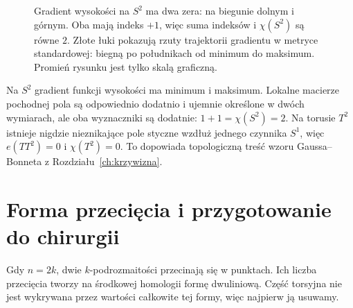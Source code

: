 \begin{figure}[htbp]
\centering
{}
\caption{Gradient wysokości na $S^2$
ma dwa zera: na biegunie dolnym
i górnym. Oba mają indeks $+1$,
więc suma indeksów i $\chi(S^2)$ są równe $2$.
Złote łuki pokazują rzuty trajektorii gradientu
w metryce standardowej: biegną po południkach od minimum
do maksimum. Promień rysunku jest tylko skalą graficzną.}
\label{fig:poincare-hopf-16}
\end{figure}

\begin{przyklad}
Na $S^2$ gradient
funkcji wysokości
ma minimum i maksimum.
Lokalne macierze
pochodnej pola są
odpowiednio dodatnio
i ujemnie określone
w dwóch wymiarach,
ale oba wyznaczniki
są dodatnie:
$1+1=\chi(S^2)=2$.
Na torusie $T^2$
istnieje nigdzie
nieznikające pole
styczne wzdłuż
jednego czynnika
$S^1$, więc
$e(TT^2)=0$ i
$\chi(T^2)=0$.
To dopowiada topologiczną
treść wzoru
Gaussa--Bonneta z
Rozdziału~\ref{ch:krzywizna}.
\end{przyklad}

\section{Forma przecięcia i przygotowanie do chirurgii}
\label{sec:forma-przeciecia-16}

Gdy $n=2k$, dwie
$k$-podrozmaitości
przecinają się
w punktach.
Ich liczba przecięcia
tworzy na środkowej
homologii formę
dwuliniową. Część
torsyjna nie jest
wykrywana przez
wartości całkowite
tej formy, więc
najpierw ją usuwamy.

